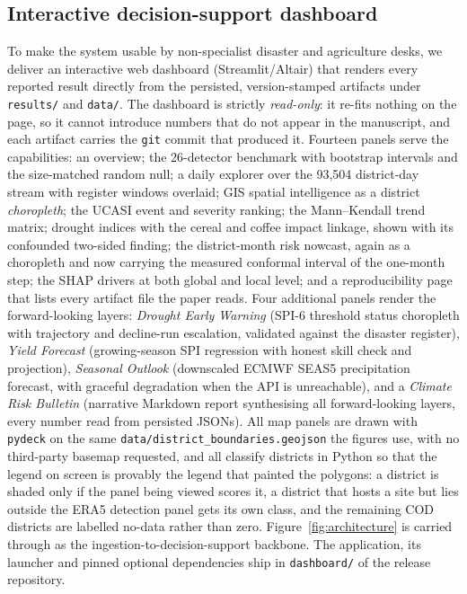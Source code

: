 \documentclass[preprint,12pt]{elsarticle}
\begin{document}
\subsection{Interactive decision-support dashboard}\label{sec:dashboard}
To make the system usable by non-specialist disaster and agriculture desks, we
deliver an interactive web dashboard (Streamlit/Altair) that renders every
reported result directly from the persisted, version-stamped artifacts under
\texttt{results/} and \texttt{data/}. The dashboard is strictly \emph{read-only}: it
re-fits nothing on the page, so it cannot introduce numbers that do not appear in
the manuscript, and each artifact carries the \texttt{git} commit that produced it.
Fourteen panels serve the capabilities: an overview; the 26-detector benchmark
with bootstrap intervals and the size-matched random null; a daily explorer over
the 93{,}504 district-day stream with register windows overlaid; GIS spatial
intelligence as a district \emph{choropleth}; the UCASI event and severity
ranking; the Mann--Kendall trend matrix; drought indices with the cereal and
coffee impact linkage, shown with its confounded two-sided finding; the
district-month risk nowcast, again as a choropleth and now carrying the measured
conformal interval of the one-month step; the SHAP drivers at both global and
local level; and
a reproducibility page that lists every artifact file the paper reads.
Four additional panels render the forward-looking layers: \emph{Drought Early
Warning} (SPI-6 threshold status choropleth with trajectory and decline-run
escalation, validated against the disaster register), \emph{Yield Forecast}
(growing-season SPI regression with honest skill check and projection),
\emph{Seasonal Outlook} (downscaled ECMWF SEAS5 precipitation forecast, with
graceful degradation when the API is unreachable), and a \emph{Climate Risk
Bulletin} (narrative Markdown report synthesising all forward-looking layers,
every number read from persisted JSONs). All map
panels
are drawn with \texttt{pydeck} on the same \texttt{data/district\_boundaries.geojson}
the figures use, with no third-party basemap requested, and all classify
districts in Python so that the legend on screen is provably the legend that
painted the polygons: a district is shaded only if the panel being viewed scores
it, a district that hosts a site but lies outside the ERA5 detection panel gets
its own class, and the remaining COD districts are labelled no-data rather than
zero. Figure~\ref{fig:architecture} is carried through as
the ingestion-to-decision-support backbone. The
application, its launcher and pinned optional dependencies ship in
\texttt{dashboard/} of the release repository.
\end{document}
